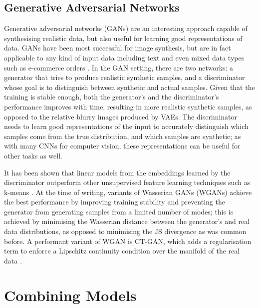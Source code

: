 \subsection{Generative Adversarial Networks}

Generative adversarial networks (GANs) are an interesting approach capable of synthesising realistic data, but also useful for learning good representations of data.
GANs have been most successful for image synthesis, but are in fact applicable to any kind of input data including text \cite{textgan} and even mixed data types such as e-commerce orders \cite{ecomgan}.
In the GAN setting, there are two networks: a generator that tries to produce realistic synthetic samples, and a discriminator whose goal is to distinguish between synthetic and actual samples.
Given that the training is stable enough, both the generator's and the discriminator's performance improves with time, resulting in more realistic synthetic samples, as opposed to the relative blurry images produced by VAEs.
The discriminator needs to learn good representations of the input to  accurately distinguish which samples come from the true distribution, and which samples are synthetic; as with many CNNs for computer vision, these representations can be useful for other tasks as well.

It has been shown that  linear models  from the embeddings learned by the discriminator outperform other unsupervised feature learning techniques such as k-means \cite{dcgan}.
At the time of writing, variants of Wasserian GANs (WGANs) achieve the best performance by improving training stability and preventing the generator from generating samples from a limited number of modes; this is achieved by minimising the Wasserian distance between the generator's and real data distributions, as opposed to minimising the JS divergence as was common before.
A performant variant of WGAN is CT-GAN, which adds a regularisation term to enforce a Lipschitz continuity condition over the manifold of the real data \cite{ctgan}.

\section{Combining Models}
\label{bg_ensembling}


